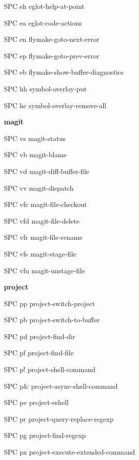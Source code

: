 \documentclass[10pt]{article}
\renewcommand\subsection[1]{\smallskip\par\textbf{\color{heading}#1}}
\begin{document}
\begin{multicols}{4}
\begin{keylist}
  \item[SPC eh] eglot-help-at-point
  \item[SPC ea] eglot-code-actions
  \item[SPC en] flymake-goto-next-error
  \item[SPC ep] flymake-goto-prev-error
  \item[SPC eb] flymake-show-buffer-diagnostics
  \item[SPC hh] symbol-overlay-put
  \item[SPC hc] symbol-overlay-remove-all
  
  \subsection{magit}
  \begin{keylist}
  \item[SPC vs] magit-status
  \item[SPC vb] magit-blame
  \item[SPC vd] magit-diff-buffer-file
  \item[SPC vv] magit-dispatch
  \item[SPC vfc] magit-file-checkout
  \item[SPC vfd] magit-file-delete
  \item[SPC vfr] magit-file-rename
  \item[SPC vfs] magit-stage-file
  \item[SPC vfu] magit-unstage-file
  \end{keylist}

  \subsection{project}
  \begin{keylist}
  \item[SPC pp] project-switch-project
  \item[SPC pb] project-switch-to-buffer
  \item[SPC pd] project-find-dir
  \item[SPC pf] project-find-file
  \item[SPC p!] project-shell-command
  \item[SPC p&] project-async-shell-command
  \item[SPC pe] project-eshell
  \item[SPC pr] project-query-replace-regexp
  \item[SPC pg] project-find-regexp
  \item[SPC px] project-execute-extended-command
  \end{keylist}


\end{keylist}
\end{multicols}
\end{document}
